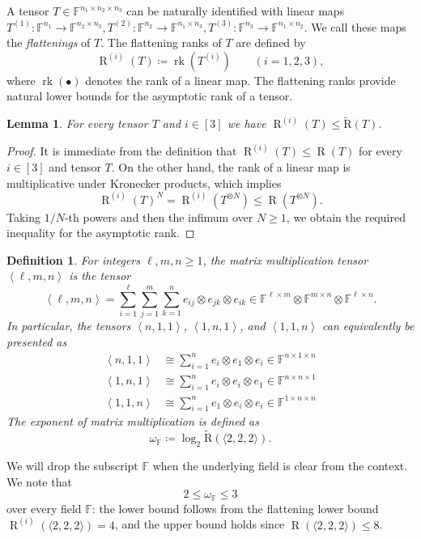 \documentclass[11pt,letterpaper]{article}
\newtheorem{definition}[theorem]{Definition}\AddToHook{env/definition/begin}{\crefalias{theorem}{definition}}
\newtheorem{lemma}[theorem]{Lemma}\AddToHook{env/lemma/begin}{\crefalias{theorem}{lemma}}
\numberwithin{equation}{section}
\newcommand{\ark}{\widetilde{\mathrm{R}}}
\newcommand{\FF}{\mathbb{F}}
\DeclareMathOperator{\Rk}{\mathrm{R}}
\begin{document}
A tensor $T\in\FF^{n_1\times n_2\times n_3}$ can be naturally identified with  linear maps $T^{(1)}:\FF^{n_1}\rightarrow\FF^{n_2\times n_3}, T^{(2)}:\FF^{n_2}\rightarrow\FF^{n_1\times n_3}, T^{(3)}:\FF^{n_3}\rightarrow\FF^{n_1\times n_2}$.
We call these maps the \emph{flattenings} of $T$.
The flattening ranks of $T$ are defined by \[
\Rk^{(i)}(T) \coloneqq \operatorname{rk}(T^{(i)}) \qquad (i=1,2,3),
\]
where $\operatorname{rk}(\bullet)$ denotes the rank of a linear map.
The flattening ranks provide natural lower bounds for the asymptotic rank of a tensor.
\begin{lemma}
\label{lem:flattening-lb}
For every tensor $T$ and $i\in [3]$ we have $\Rk^{(i)}(T)\leq \ark(T)$.
\end{lemma}
\begin{proof}
    It is immediate from the definition that $\Rk^{(i)}(T)\leq \Rk(T)$ for every $i\in [3]$ and tensor $T$.
    On the other hand, the rank of a linear map is multiplicative under Kronecker products, which implies \[
    \Rk^{(i)}(T)^N = \Rk^{(i)}(T^{\otimes N})\leq \Rk(T^{\otimes N}).
    \] Taking $1/N$-th powers and then the infimum over $N\geq 1$, we obtain the required inequality for the asymptotic rank.
\end{proof}

\begin{definition}\label{def:matrix-multiplication}
  For integers $\ell, m, n \geq 1$, the \emph{matrix multiplication tensor} $\left<\ell, m, n\right>$ is the tensor
  \[ \left<\ell, m, n\right> = \sum_{i = 1}^{\ell} \sum_{j = 1}^{m} \sum_{k = 1}^{n} e_{ij} \otimes e_{jk} \otimes
  e_{ik} \in \FF^{\ell \times m} \otimes \FF^{m \times n} \otimes \FF^{\ell\times n}.\]
  In particular, the tensors $\left<n, 1, 1\right>$, $\left<1, n, 1\right>$, and $\left<1, 1, n\right>$ can equivalently be presented as
  \begin{align*}
    \left<n, 1, 1\right> & \cong \sum_{i = 1}^{n} e_i \otimes e_1 \otimes e_i \in \FF^{n \times 1 \times n} \\
    \left<1, n, 1\right> & \cong \sum_{i = 1}^{n} e_i \otimes e_i \otimes e_1 \in \FF^{n \times n \times 1} \\
    \left<1, 1, n\right> & \cong \sum_{i = 1}^{n} e_1 \otimes e_i \otimes e_i \in \FF^{1 \times n \times n}
  \end{align*}
The exponent of matrix multiplication is defined as \[
\omega_{\FF} \coloneqq \log_2\ark(\langle 2,2,2\rangle).
\]
\end{definition}
\noindent
We will drop the subscript $\FF$ when the underlying field is clear from the context.
We note that \[
2 \leq \omega_{\FF} \leq 3
\] over every field $\FF$: the lower bound follows from the flattening lower bound $\Rk^{(i)}(\langle 2,2,2\rangle)=4$, and the upper bound holds since $\Rk(\langle 2,2,2\rangle)\leq 8$.
\end{document}
